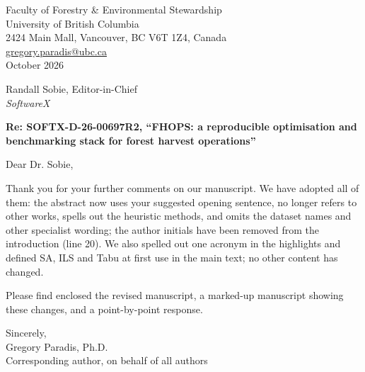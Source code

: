 \documentclass[10pt]{article}
\begin{document}
\begin{flushright}
Faculty of Forestry \& Environmental Stewardship\\
University of British Columbia\\
2424 Main Mall, Vancouver, BC V6T 1Z4, Canada\\
\href{mailto:gregory.paradis@ubc.ca}{gregory.paradis@ubc.ca}\\[0.5em]
October 2026
\end{flushright}

Randall Sobie, Editor-in-Chief\\
\textit{SoftwareX}

\textbf{Re: SOFTX-D-26-00697R2, ``FHOPS: a reproducible optimisation and benchmarking stack for forest harvest operations''}

Dear Dr. Sobie,

Thank you for your further comments on our manuscript. We have adopted all of them: the abstract now uses your suggested opening sentence, no longer refers to other works, spells out the heuristic methods, and omits the dataset names and other specialist wording; the author initials have been removed from the introduction (line 20). We also spelled out one acronym in the highlights and defined SA, ILS and Tabu at first use in the main text; no other content has changed.

Please find enclosed the revised manuscript, a marked-up manuscript showing these changes, and a point-by-point response.

Sincerely,\\[1.5em]
Gregory Paradis, Ph.D.\\
Corresponding author, on behalf of all authors
\end{document}
